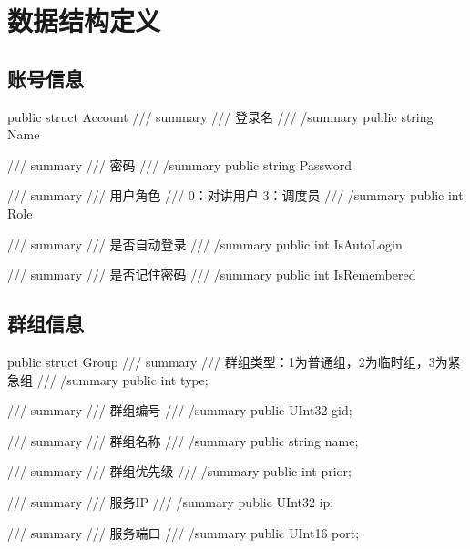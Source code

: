 \documentclass[letterpaper,10pt,english]{sphinxmanual}
\begin{document}
\section{数据结构定义}
\label{\detokenize{csharp:id84}}

\subsection{账号信息}
\label{\detokenize{csharp:id85}}
%
\begin{sphinxVerbatim}[commandchars=\\\{\}]
public struct Account
\PYGZob{}
       /// \PYGZlt{}summary\PYGZgt{}
       /// 登录名
       /// \PYGZlt{}/summary\PYGZgt{}
       public string Name

       /// \PYGZlt{}summary\PYGZgt{}
       /// 密码
       /// \PYGZlt{}/summary\PYGZgt{}
       public string Password

       /// \PYGZlt{}summary\PYGZgt{}
       /// 用户角色
       /// 0：对讲用户 3：调度员
       /// \PYGZlt{}/summary\PYGZgt{}
       public int Role

       /// \PYGZlt{}summary\PYGZgt{}
       /// 是否自动登录
       /// \PYGZlt{}/summary\PYGZgt{}
       public int IsAutoLogin

       /// \PYGZlt{}summary\PYGZgt{}
       /// 是否记住密码
       /// \PYGZlt{}/summary\PYGZgt{}
       public int IsRemembered
\PYGZcb{}
\end{sphinxVerbatim}


\subsection{群组信息}
\label{\detokenize{csharp:id86}}
%
\begin{sphinxVerbatim}[commandchars=\\\{\}]
 public struct Group
   \PYGZob{}
    /// \PYGZlt{}summary\PYGZgt{}
    /// 群组类型：1为普通组，2为临时组，3为紧急组
    /// \PYGZlt{}/summary\PYGZgt{}
    public int type;

    /// \PYGZlt{}summary\PYGZgt{}
    /// 群组编号
    /// \PYGZlt{}/summary\PYGZgt{}
    public UInt32 gid;

    /// \PYGZlt{}summary\PYGZgt{}
    /// 群组名称
    /// \PYGZlt{}/summary\PYGZgt{}
    public string name;

    /// \PYGZlt{}summary\PYGZgt{}
    /// 群组优先级
    /// \PYGZlt{}/summary\PYGZgt{}
    public int prior;

    /// \PYGZlt{}summary\PYGZgt{}
    /// 服务IP
    /// \PYGZlt{}/summary\PYGZgt{}
    public UInt32 ip;

    /// \PYGZlt{}summary\PYGZgt{}
    /// 服务端口
    /// \PYGZlt{}/summary\PYGZgt{}
    public UInt16 port;
\PYGZcb{}
\end{sphinxVerbatim}
\end{document}
